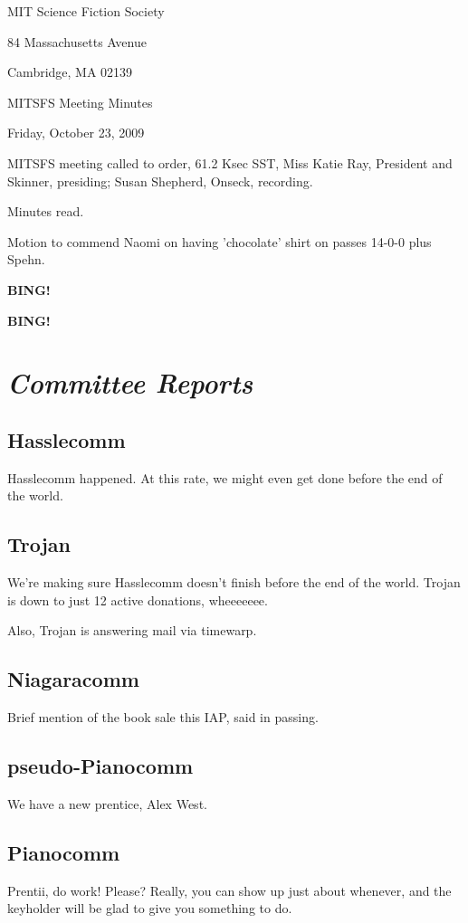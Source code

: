 \documentclass[10pt]{article}
\newcommand{\bing}{{\bf BING!} }
\newcommand{\goto}[1]{\bing \vskip 12pt \section*{{\em{#1}}}}
\newcommand{\ps}{ plus Spehn\xspace}
\begin{document}
\begin{center}

MIT Science Fiction Society

84 Massachusetts Avenue

Cambridge, MA 02139

\vspace{12pt}

MITSFS Meeting Minutes

Friday, October 23, 2009

\end{center}

\vspace{18pt}

\setlength{\parskip}{6pt}

\noindent
MITSFS meeting called to order, 61.2 Ksec SST,
Miss Katie Ray, President and Skinner, presiding; Susan Shepherd, Onseck, recording.

Minutes read.

Motion to commend Naomi on having 'chocolate' shirt on passes 14-0-0\ps.

\bing

\goto{Committee Reports}

\subsection*{Hasslecomm}
Hasslecomm happened. At this rate, we might even get done before the end of the world.

\subsection*{Trojan}
We're making sure Hasslecomm doesn't finish before the end of the world. Trojan is down to just 12 active donations, wheeeeeee.

Also, Trojan is answering mail via timewarp.

\subsection*{Niagaracomm}
Brief mention of the book sale this IAP, said in passing.

\subsection*{pseudo-Pianocomm}
We have a new prentice, Alex West.

\subsection*{Pianocomm}
Prentii, do work! Please? Really, you can show up just about whenever, and the keyholder will be glad to give you something to do.
\end{document}
